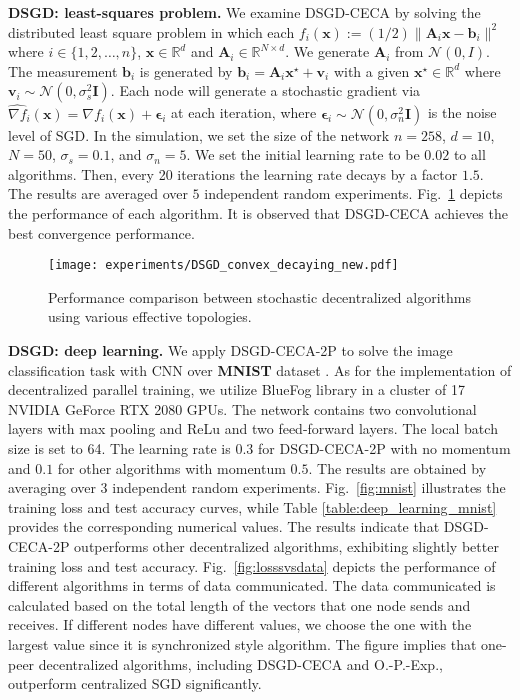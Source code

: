 \documentclass{article}
\newcommand{\bvb}{\boldsymbol{b}}
\newcommand{\bvv}{\boldsymbol{v}}
\newcommand{\bvx}{\boldsymbol{x}}
\newcommand{\vepsilon}{\bm{\epsilon}}
\newcommand{\vA}{\mathbf{A}}
\newcommand{\vI}{\mathbf{I}}
\theoremstyle{plain}
\theoremstyle{definition}
\begin{document}
\textbf{DSGD: least-squares problem.}
We examine DSGD-CECA by solving the distributed least square problem in which each $f_i(\bvx) := (1/2)\|\vA_i \bvx - \bvb_i\|^2$ where $i\in \{1,2,\ldots, n\}$, $\bvx\in \mathbb{R}^d$ and $\vA_i \in \mathbb{R}^{N\times d}$. We generate $\vA_i$ from $\mathcal{N}(0, I)$. The measurement $\bvb_i$ is generated by $\bvb_i = \vA_i \bvx^\star + \bvv_i$ with a given $\bvx^\star \in \mathbb{R}^d$ where $\bvv_i \sim \mathcal{N}(0,\sigma_s^2 \vI)$. Each node will generate a stochastic gradient via $\widehat{\nabla f}_i(\bvx) = {\nabla f}_i(\bvx) + \vepsilon_i$ at each iteration, where $\vepsilon_i \sim \mathcal{N}(0,\sigma_n^2 \vI)$ is the noise level of SGD. In the simulation, we set the size of the network $n=258$, $d=10$, $N=50$, $\sigma_s=0.1$, and $\sigma_n=5$. We set the initial learning rate to be $0.02$ to all algorithms. Then, every 20 iterations the learning rate decays by a factor $1.5$. The results are averaged over $5$ independent random experiments. Fig.~\ref{fig:DSGD_convex} depicts the performance of each algorithm. It is observed that DSGD-CECA achieves the best convergence performance. 
 





\begin{figure}[ht]
\begin{center}
\centerline{\texttt{[image: experiments/DSGD\_convex\_decaying\_new.pdf]}}
\vskip -0.1in
\caption{Performance comparison between stochastic decentralized algorithms using various effective topologies.}
\label{fig:DSGD_convex}
\end{center}
\vskip -0.2in
\end{figure}


\textbf{DSGD: deep learning.} We apply DSGD-CECA-2P to solve the image classification task with CNN over \textbf{MNIST} dataset \cite{lecun2010mnist}. As for the implementation of decentralized parallel training, we utilize BlueFog library \cite{bluefog} in a cluster of 17 NVIDIA GeForce RTX 2080 GPUs.  The network contains two convolutional layers with max pooling and ReLu and two feed-forward layers. The local batch size is set to 64. The learning rate is $0.3$ for DSGD-CECA-2P with no momentum and $0.1$ for other algorithms with momentum $0.5$. 
The results are obtained by averaging
over 3 independent random experiments. Fig.~\ref{fig:mnist} illustrates the training loss and test accuracy curves, while Table \ref{table:deep_learning_mnist} provides the corresponding numerical values. The results indicate that DSGD-CECA-2P outperforms other decentralized algorithms, exhibiting slightly better training loss and test accuracy.
Fig.~\ref{fig:losssvsdata} depicts the performance of different algorithms in terms of data communicated. The data communicated is calculated based on the total length of the vectors that one node sends and receives. If different nodes have different values, we choose the one with the largest value since it is synchronized style algorithm. The figure implies that one-peer decentralized algorithms, including DSGD-CECA and O.-P.-Exp., outperform centralized SGD significantly. 
\end{document}
